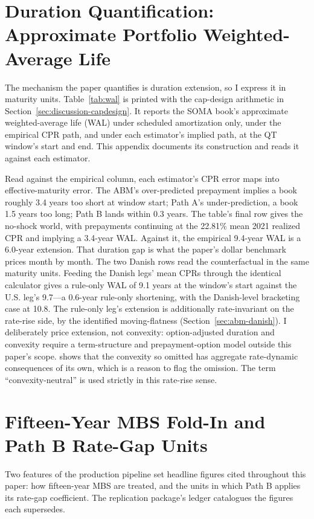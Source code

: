 \documentclass[12pt]{article}
\begin{document}
\section{Duration Quantification: Approximate Portfolio Weighted-Average Life}\label{sec:robustness-wal}

The mechanism the paper quantifies is duration extension, so I express it in maturity units. Table~\ref{tab:wal} is printed with the cap-design arithmetic in Section~\ref{sec:discussion-capdesign}. It reports the SOMA book's approximate weighted-average life (WAL) under scheduled amortization only, under the empirical CPR path, and under each estimator's implied path, at the QT window's start and end. This appendix documents its construction and reads it against each estimator.

Read against the empirical column, each estimator's CPR error maps into effective-maturity error. The ABM's over-predicted prepayment implies a book roughly 3.4 years too short at window start; Path A's under-prediction, a book 1.5 years too long; Path B lands within 0.3 years. The table's final row gives the no-shock world, with prepayments continuing at the 22.81\% mean 2021 realized CPR and implying a 3.4-year WAL. Against it, the empirical 9.4-year WAL is a 6.0-year extension. That duration gap is what the paper's dollar benchmark prices month by month. The two Danish rows read the counterfactual in the same maturity units. Feeding the Danish legs' mean CPRs through the identical calculator gives a rule-only WAL of 9.1 years at the window's start against the U.S. leg's 9.7---a 0.6-year rule-only shortening, with the Danish-level bracketing case at 10.8. The rule-only leg's extension is additionally rate-invariant on the rate-rise side, by the identified moving-flatness (Section~\ref{sec:abm-danish}). I deliberately price extension, not convexity: option-adjusted duration and convexity require a term-structure and prepayment-option model outside this paper's scope. \citet{hanson2014} shows that the convexity so omitted has aggregate rate-dynamic consequences of its own, which is a reason to flag the omission. The term ``convexity-neutral'' is used strictly in this rate-rise sense.

\section{Fifteen-Year MBS Fold-In and Path B Rate-Gap Units}\label{sec:robustness-pipeline}

Two features of the production pipeline set headline figures cited throughout this paper: how fifteen-year MBS are treated, and the units in which Path B applies its rate-gap coefficient. The replication package's ledger catalogues the figures each supersedes.
\end{document}

